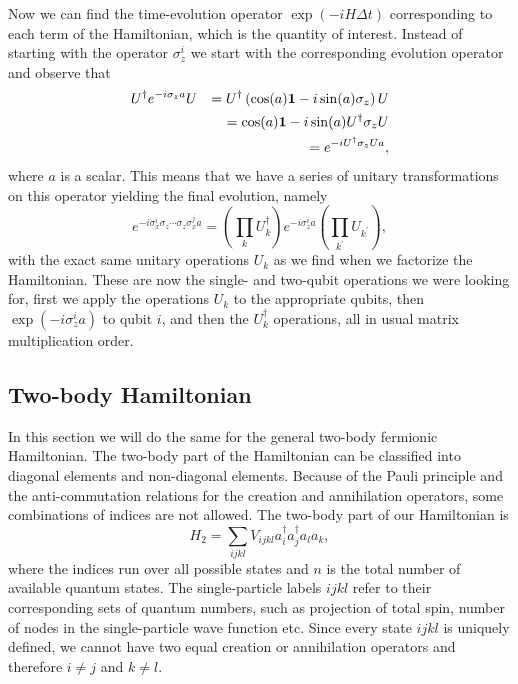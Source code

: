 Now we can find  
the time-evolution operator $\exp(-iH\Delta t)$ corresponding to each
term of the Hamiltonian, which is the quantity of interest. 
Instead of starting
with the operator $\sigma_z^i$ we start with the corresponding
evolution operator and observe that
\begin{eqnarray}
U^\dag e^{-i\sigma_z a} U &&= U^\dag \left( \cos(a){\bf 1}
-i\sin(a) \sigma_z \right) U\notag \\
&&=\cos(a){\bf 1} -i \sin(a) U^\dag \sigma_zU \notag \\
&&=e^{-i U^\dag\sigma_zU a},
\end{eqnarray}
where $a$ is  a scalar.
This means that we have a series of unitary transformations on this
operator yielding the final evolution,  namely
\begin{equation}
\label{eq:Us}
e^{-i \sigma_x^i \sigma_z \cdots \sigma_z \sigma_x^j a} 
= \left(\prod_k U_k^\dag \right) e^{-i\sigma_z^ia} 
\left(\prod_{k^\prime}
U_{k^\prime}\right),
\end{equation}
with the exact same unitary operations $U_k$ as we find when we
factorize the Hamiltonian. These are now the single- and two-qubit operations we
were looking for, first we apply the operations $U_k$ to the
appropriate qubits, then $\exp(-i\sigma_z^ia)$ to qubit $i$, and then
the $U_k^\dag$ operations, all in usual matrix multiplication order.



\subsection{Two-body Hamiltonian}
\label{sec:2bH}
In this section we will do the same for the general two-body fermionic
Hamiltonian.
The two-body part of the Hamiltonian can be classified into
diagonal elements and non-diagonal elements. Because of the Pauli
principle and the anti-commutation relations for the creation and
annihilation operators, some combinations of indices are not allowed.
The two-body part of our Hamiltonian is 
\begin{equation}
H_2 = \sum_{ijkl} V_{ijkl} a_i^\dag a_j^\dag a_l a_k,
\end{equation} 
where the indices run over all possible states and $n$  is the total number
of available quantum states. 
The single-particle labels $ijkl$ refer to their 
corresponding sets of quantum numbers, such as 
projection of total spin, number of nodes in the single-particle wave function etc. Since every state
$ijkl$ is uniquely defined,
we cannot have two equal
creation or annihilation operators and therefore $i\neq j$ and $k\neq
l$.

